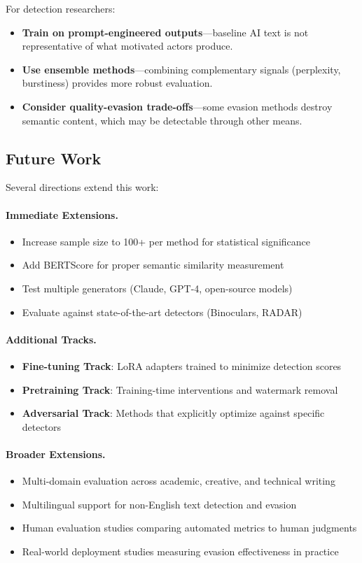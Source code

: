 For detection researchers:
\begin{itemize}
    \item \textbf{Train on prompt-engineered outputs}---baseline AI text is not representative of what motivated actors produce.
    \item \textbf{Use ensemble methods}---combining complementary signals (perplexity, burstiness) provides more robust evaluation.
    \item \textbf{Consider quality-evasion trade-offs}---some evasion methods destroy semantic content, which may be detectable through other means.
\end{itemize}

\subsection{Future Work}

Several directions extend this work:

\paragraph{Immediate Extensions.}
\begin{itemize}
    \item Increase sample size to 100+ per method for statistical significance
    \item Add BERTScore for proper semantic similarity measurement
    \item Test multiple generators (Claude, GPT-4, open-source models)
    \item Evaluate against state-of-the-art detectors (Binoculars, RADAR)
\end{itemize}

\paragraph{Additional Tracks.}
\begin{itemize}
    \item \textbf{Fine-tuning Track}: LoRA adapters trained to minimize detection scores
    \item \textbf{Pretraining Track}: Training-time interventions and watermark removal
    \item \textbf{Adversarial Track}: Methods that explicitly optimize against specific detectors
\end{itemize}

\paragraph{Broader Extensions.}
\begin{itemize}
    \item Multi-domain evaluation across academic, creative, and technical writing
    \item Multilingual support for non-English text detection and evasion
    \item Human evaluation studies comparing automated metrics to human judgments
    \item Real-world deployment studies measuring evasion effectiveness in practice
\end{itemize}

